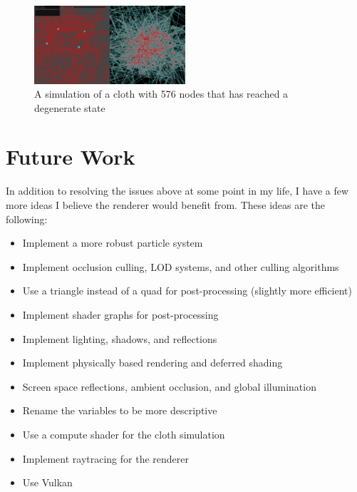 \documentclass[letterpaper, 10 pt, conference]{ieeeconf}  %
\begin{document}
\begin{figure}
        \centering
        \includegraphics[width=0.5\textwidth]{chaos1.png}
        \caption{A simulation of a cloth with 576 nodes that has reached a degenerate state} \label{fig:chaos}
\end{figure}


\section {Future Work}
In addition to resolving the issues above at some point in my life, I have a few more ideas I believe the renderer would benefit from. These ideas are the following:
\begin{itemize}
        \item Implement a more robust particle system
        \item Implement occlusion culling, LOD systems, and other culling algorithms
        \item Use a triangle instead of a quad for post-processing (slightly more efficient)
        \item Implement shader graphs for post-processing
        \item Implement lighting, shadows, and reflections
        \item Implement physically based rendering and deferred shading
        \item Screen space reflections, ambient occlusion, and global illumination
        \item Rename the variables to be more descriptive
        \item Use a compute shader for the cloth simulation
        \item Implement raytracing for the renderer
        \item Use Vulkan
\end{itemize}
\end{document}
